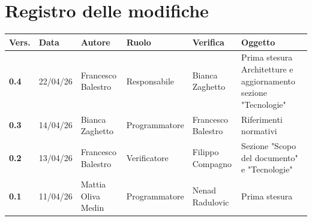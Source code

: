 \documentclass[a4paper,12pt]{article}
\begin{document}
    

    \section*{Registro delle modifiche} {
        \begin{table}[h!]
                \begin{tabularx}{\textwidth}{|l|l|l|l|L|L|}
                \hline
                \textbf{Vers.} & \textbf{Data} & \textbf{Autore} & \textbf{Ruolo} & \textbf{Verifica} & \textbf{Oggetto} \\
                \hline
                \textbf{0.4} & 22/04/26 & Francesco Balestro & Responsabile & Bianca Zaghetto & Prima stesura Architetture e aggiornamento sezione "Tecnologie" \\
                \hline
                \textbf{0.3} & 14/04/26 & Bianca Zaghetto & Programmatore & Francesco Balestro & Riferimenti normativi \\
                \hline
                \textbf{0.2} & 13/04/26 & Francesco Balestro & Verificatore & Filippo Compagno & Sezione "Scopo del documento" e "Tecnologie" \\
                \hline
                \textbf{0.1} & 11/04/26 & Mattia Oliva Medin & Programmatore & Nenad Radulovic & Prima stesura \\
                \hline
            \end{tabularx}
        \end{table}
    }
    \newpage
    
    \tableofcontents
    \newpage

    \listoffigures
    \newpage
    
    \listoftables
    \newpage
\end{document}
